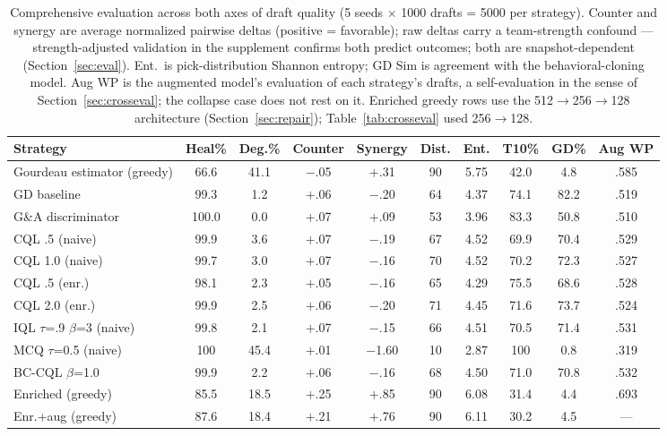 \documentclass[journal]{IEEEtran}
\begin{document}
\begin{table}[t]
\centering
\caption{Comprehensive evaluation across both axes of draft quality (5 seeds $\times$ 1000 drafts = 5000 per strategy). Counter and synergy are average normalized pairwise deltas (positive = favorable); raw deltas carry a team-strength confound — strength-adjusted validation in the supplement confirms both predict outcomes; both are snapshot-dependent (Section~\ref{sec:eval}). Ent.\ is pick-distribution Shannon entropy; GD Sim is agreement with the behavioral-cloning model. Aug WP is the augmented model's evaluation of each strategy's drafts, a self-evaluation in the sense of Section~\ref{sec:crosseval}; the collapse case does not rest on it. Enriched greedy rows use the 512$\to$256$\to$128 architecture (Section~\ref{sec:repair}); Table~\ref{tab:crosseval} used 256$\to$128.}
\label{tab:rich}
\begin{tabular}{lccccccccc}
\toprule
Strategy & Heal\% & Deg.\% & Counter & Synergy & Dist. & Ent. & T10\% & GD\% & Aug WP \\
\midrule
Gourdeau estimator (greedy) & 66.6 & 41.1 & $-$.05 & $+$.31 & 90 & 5.75 & 42.0 & 4.8 & .585 \\
GD baseline & 99.3 & 1.2 & $+$.06 & $-$.20 & 64 & 4.37 & 74.1 & 82.2 & .519 \\
G\&A discriminator & 100.0 & 0.0 & $+$.07 & $+$.09 & 53 & 3.96 & 83.3 & 50.8 & .510 \\
CQL .5 (naive) & 99.9 & 3.6 & $+$.07 & $-$.19 & 67 & 4.52 & 69.9 & 70.4 & .529 \\
CQL 1.0 (naive) & 99.7 & 3.0 & $+$.07 & $-$.16 & 70 & 4.52 & 70.2 & 72.3 & .527 \\
CQL .5 (enr.) & 98.1 & 2.3 & $+$.05 & $-$.16 & 65 & 4.29 & 75.5 & 68.6 & .528 \\
CQL 2.0 (enr.) & 99.9 & 2.5 & $+$.06 & $-$.20 & 71 & 4.45 & 71.6 & 73.7 & .524 \\
IQL $\tau$=.9 $\beta$=3 (naive) & 99.8 & 2.1 & $+$.07 & $-$.15 & 66 & 4.51 & 70.5 & 71.4 & .531 \\
MCQ $\tau$=0.5 (naive) & 100 & 45.4 & $+$.01 & $-$1.60 & 10 & 2.87 & 100 & 0.8 & .319 \\
BC-CQL $\beta$=1.0 & 99.9 & 2.2 & $+$.06 & $-$.16 & 68 & 4.50 & 71.0 & 70.8 & .532 \\
\midrule
Enriched (greedy) & 85.5 & 18.5 & $+$.25 & $+$.85 & 90 & 6.08 & 31.4 & 4.4 & .693 \\
Enr.+aug (greedy) & 87.6 & 18.4 & $+$.21 & $+$.76 & 90 & 6.11 & 30.2 & 4.5 & --- \\
\bottomrule
\end{tabular}
\end{table}
\end{document}
